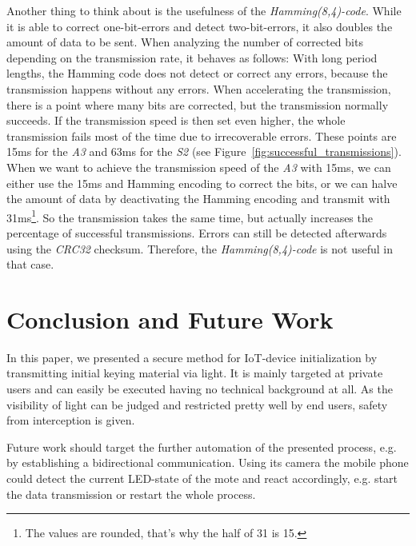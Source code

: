 \documentclass{sig-alternate} %
\begin{document}
Another thing to think about is the usefulness of the \textit{Hamming(8,4)-code}.
While it is able to correct one-bit-errors and detect two-bit-errors, it also doubles the amount of data to be sent. 
When analyzing the number of corrected bits depending on the transmission rate, it behaves as follows:
With long period lengths, the Hamming code does not detect or correct any errors, because the transmission happens without any errors.
When accelerating the transmission, there is a point where many bits are corrected, but the transmission normally succeeds.
If the transmission speed is then set even higher, the whole transmission fails most of the time due to irrecoverable errors.
These points are 15ms for the \textit{A3} and 63ms for the \textit{S2} (see Figure~\ref{fig:successful_transmissions}).
When we want to achieve the transmission speed of the \textit{A3} with 15ms, we can either use the 15ms and Hamming encoding to correct the bits, or we can halve the amount of data by deactivating the Hamming encoding and transmit with 31ms\footnote{The values are rounded, that's why the half of 31 is 15.}.
So the transmission takes the same time, but actually increases the percentage of successful transmissions.
Errors can still be detected afterwards using the \textit{CRC32} checksum.
Therefore, the \textit{Hamming(8,4)-code} is not useful in that case.



\section{Conclusion and Future Work}
\label{sec:future_work}

In this paper, we presented a secure method for IoT-device initialization by transmitting initial keying material via light.
It is mainly targeted at private users and can easily be executed having no technical background at all.
As the visibility of light can be judged and restricted pretty well by end users, safety from interception is given.

Future work should target the further automation of the presented process, e.g. by establishing a bidirectional communication.
Using its camera the mobile phone could detect the current LED-state of the mote and react accordingly, e.g. start the data transmission or restart the whole process.
\end{document}
